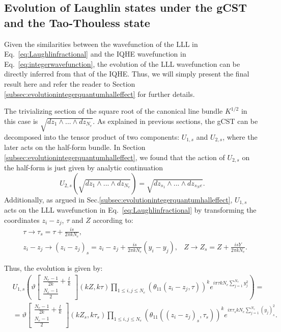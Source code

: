 \documentclass[a4paper,11pt]{article}
\begin{document}
\subsection{Evolution of Laughlin states under the gCST and the Tao-Thouless state}
\label{subsec:EvolutionFQHE}

Given the similarities between the wavefunction of the LLL in Eq.~\eqref{eq:Laughlinfractional} and the IQHE wavefunction in Eq.~\eqref{eq:integerwavefunction}, the evolution of the LLL wavefunction can be directly inferred from that of the IQHE. Thus, we will simply present the final result here and refer the reader to Section \ref{subsec:evolutionintegerquantumhalleffect} for further details.

The trivializing section of the square root of the canonical line bundle $K^{1/2}$ in this case is $\sqrt{dz_{1}\wedge...\wedge dz_{N_e}}$. As explained in previous sections, the gCST can be decomposed into the tensor product of two components: $U_{1,s}$ and  $U_{2,s}$, where the later acts on the half-form bundle. In Section \ref{subsec:evolutionintegerquantumhalleffect}, we found that the action of $U_{2,s}$ on the half-form is just given by analytic continuation 
\begin{equation}
    U_{2,s}(\sqrt{dz_{1}\wedge...\wedge dz_{N_e}}) = \sqrt{dz_{s_1}\wedge...\wedge dz_{s_Ne}}. 
    \label{evolutionhalfformFQHE}
\end{equation}
Additionally, as argued in Sec.\ref{subsec:evolutionintegerquantumhalleffect}, $U_{1,s}$ acts on the LLL wavefunction in Eq.~\eqref{eq:Laughlinfractional} by transforming the coordinates $z_i-z_j$, $\tau$ and $Z$ according to:
\begin{align*}
&\tau\rightarrow \tau_{s} = \tau + \frac{is}{2\pi kN_{e}},\\
&z_{i}-z_{j}\rightarrow (z_{i}-z_{j})_{s} = z_{i}-z_{j}+\frac{is}{2\pi kN_{e}}(y_{i}-y_{j}),
&Z\rightarrow Z_{s} = Z+\frac{isY}{2\pi kN_{e}}. 
\end{align*}

Thus, the evolution is given by:
\begin{align}
&U_{1,s}\left(\vartheta\begin{bmatrix}
\frac{N_e-1}{2k}+\frac{l}{k}\\
\frac{N_e-1}{2}
\end{bmatrix}(kZ,k\tau)\prod_{1\leq i,j\leq N_e}\left(\theta_{11}(z_{i}-z_{j},\tau)\right)^ke^{i\pi\tau k N_{e}\sum_{j=1}^{N_e}y_{j}^{2}}\right) =  \nonumber\\
&=\vartheta\begin{bmatrix}
\frac{N_e-1}{2k}+\frac{l}{k}\\
\frac{N_e-1}{2}
\end{bmatrix}(kZ_s,k\tau_s)\prod_{1\leq i,j\leq N_e}\left(\theta_{11}((z_{i}-z_{j})_{s},\tau_s)\right)^ke^{i\pi\tau_{s} k N_e\sum_{j=1}^{N_e}(y_{j})_{s}^{2}}.   
\label{eq:evolutionFQHEwihouthalfform}
\end{align}
\end{document}
